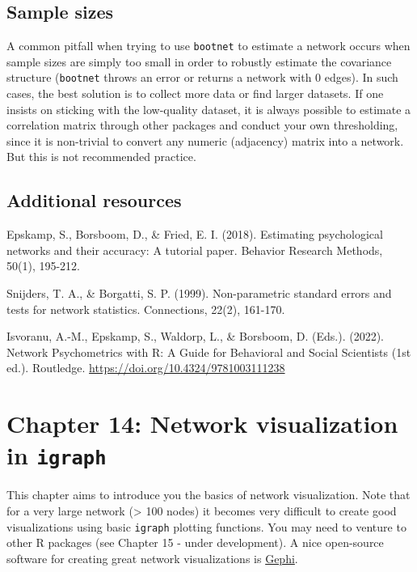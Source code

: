 \documentclass[
]{book}
\begin{document}
\section{Sample sizes}\label{sample-sizes}

A common pitfall when trying to use \texttt{bootnet} to estimate a network occurs when sample sizes are simply too small in order to robustly estimate the covariance structure (\texttt{bootnet} throws an error or returns a network with 0 edges). In such cases, the best solution is to collect more data or find larger datasets. If one insists on sticking with the low-quality dataset, it is always possible to estimate a correlation matrix through other packages and conduct your own thresholding, since it is non-trivial to convert any numeric (adjacency) matrix into a network. But this is not recommended practice.

\section{Additional resources}\label{additional-resources}

Epskamp, S., Borsboom, D., \& Fried, E. I. (2018). Estimating psychological networks and their accuracy: A tutorial paper. Behavior Research Methods, 50(1), 195-212.

Snijders, T. A., \& Borgatti, S. P. (1999). Non-parametric standard errors and tests for network statistics. Connections, 22(2), 161-170.

Isvoranu, A.-M., Epskamp, S., Waldorp, L., \& Borsboom, D. (Eds.). (2022). Network Psychometrics with R: A Guide for Behavioral and Social Scientists (1st ed.). Routledge. \url{https://doi.org/10.4324/9781003111238}

\chapter{\texorpdfstring{Chapter 14: Network visualization in \texttt{igraph}}{Chapter 14: Network visualization in igraph}}\label{ch14}

This chapter aims to introduce you the basics of network visualization. Note that for a very large network (\textgreater{} 100 nodes) it becomes very difficult to create good visualizations using basic \texttt{igraph} plotting functions. You may need to venture to other R packages (see Chapter 15 - under development). A nice open-source software for creating great network visualizations is \href{https://gephi.org/}{Gephi}.
\end{document}
